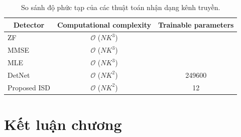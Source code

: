 \begin{table}[ht]
    \centering
    \caption{So sánh độ phức tạp của các thuật toán nhận dạng kênh truyền.}
    \label{tab:computational}
    \begin{tabular}{|l|c|c|}
    \hline
    \multicolumn{1}{|c|}{Detector} & Computational complexity & Trainable parameters \\ \hline
    ZF & $\mathcal{O}$ ($NK^3$) &  \\ \hline
    MMSE & $\mathcal{O}$ ($NK^3$) &  \\ \hline
    MLE & $\mathcal{O}$ ($NK^3$) &  \\ \hline
    DetNet~\cite{Samuel2019} & $\mathcal{O}$ ($NK^2$) & 249600 \\ \hline
    Proposed ISD & $\mathcal{O}$ ($NK^2$) & 12 \\ \hline
    \end{tabular}
\end{table}

\section{Kết luận chương}